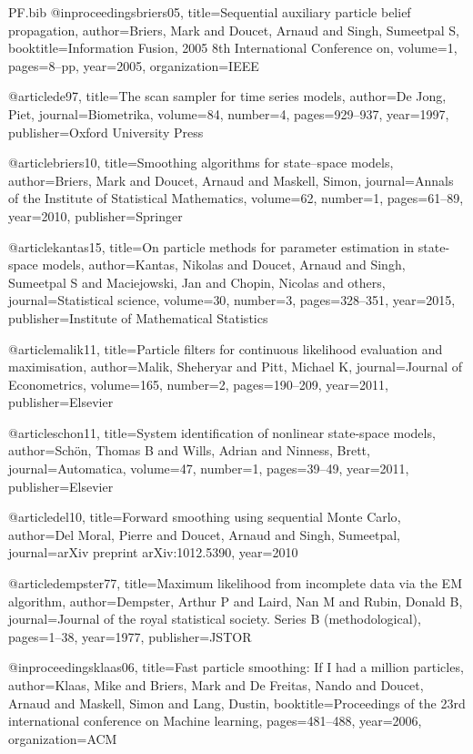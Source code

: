 \begin{filecontents*}{PF.bib}
@inproceedings{briers05,
  title={Sequential auxiliary particle belief propagation},
  author={Briers, Mark and Doucet, Arnaud and Singh, Sumeetpal S},
  booktitle={Information Fusion, 2005 8th International Conference on},
  volume={1},
  pages={8--pp},
  year={2005},
  organization={IEEE}
}

@article{de97,
  title={The scan sampler for time series models},
  author={De Jong, Piet},
  journal={Biometrika},
  volume={84},
  number={4},
  pages={929--937},
  year={1997},
  publisher={Oxford University Press}
}

@article{briers10,
  title={Smoothing algorithms for state--space models},
  author={Briers, Mark and Doucet, Arnaud and Maskell, Simon},
  journal={Annals of the Institute of Statistical Mathematics},
  volume={62},
  number={1},
  pages={61--89},
  year={2010},
  publisher={Springer}
}

@article{kantas15,
  title={On particle methods for parameter estimation in state-space models},
  author={Kantas, Nikolas and Doucet, Arnaud and Singh, Sumeetpal S and Maciejowski, Jan and Chopin, Nicolas and others},
  journal={Statistical science},
  volume={30},
  number={3},
  pages={328--351},
  year={2015},
  publisher={Institute of Mathematical Statistics}
}

@article{malik11,
  title={Particle filters for continuous likelihood evaluation and maximisation},
  author={Malik, Sheheryar and Pitt, Michael K},
  journal={Journal of Econometrics},
  volume={165},
  number={2},
  pages={190--209},
  year={2011},
  publisher={Elsevier}
}

@article{schon11,
  title={System identification of nonlinear state-space models},
  author={Sch{\"o}n, Thomas B and Wills, Adrian and Ninness, Brett},
  journal={Automatica},
  volume={47},
  number={1},
  pages={39--49},
  year={2011},
  publisher={Elsevier}
}

@article{del10,
  title={Forward smoothing using sequential Monte Carlo},
  author={Del Moral, Pierre and Doucet, Arnaud and Singh, Sumeetpal},
  journal={arXiv preprint arXiv:1012.5390},
  year={2010}
}

@article{dempster77,
  title={Maximum likelihood from incomplete data via the EM algorithm},
  author={Dempster, Arthur P and Laird, Nan M and Rubin, Donald B},
  journal={Journal of the royal statistical society. Series B (methodological)},
  pages={1--38},
  year={1977},
  publisher={JSTOR}
}

@inproceedings{klaas06,
  title={Fast particle smoothing: If I had a million particles},
  author={Klaas, Mike and Briers, Mark and De Freitas, Nando and Doucet, Arnaud and Maskell, Simon and Lang, Dustin},
  booktitle={Proceedings of the 23rd international conference on Machine learning},
  pages={481--488},
  year={2006},
  organization={ACM}
}
\end{filecontents*}

